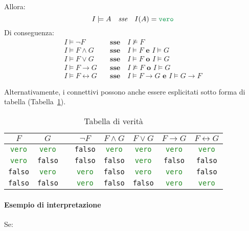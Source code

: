 \documentclass[italian, 10pt]{article}
\newcommand{\vero}{\textcolor{ForestGreen}{\texttt{vero}}\xspace} %
\newcommand{\falso}{\textcolor{BrickRed}{\texttt{falso}}\xspace} %
\begin{document}
Allora:
\[ I \models A  \quad \textit{sse} \quad I(A) = \vero \]
Di conseguenza:
\begin{align*}
  I \vDash \lnot F \quad             & \textbf{sse} \quad I \nvDash F                                                    \\
  I \vDash F \land G \quad           & \textbf{sse} \quad I \vDash F \textbf{ e } I \vDash G                             \\
  I \vDash F \lor G \quad            & \textbf{sse} \quad I \vDash F \textbf{ o } I \vDash G                             \\
  I \vDash F \rightarrow G \quad     & \textbf{sse} \quad I \nvDash F \textbf{ o } I \vDash G                            \\
  I \vDash F \leftrightarrow G \quad & \textbf{sse} \quad I \vDash F \rightarrow G \textbf{ e } I \vDash G \rightarrow F
\end{align*}

Alternativamente, i connettivi possono anche essere esplicitati sotto forma di tabella (Tabella~\ref{tab:tabella-connettivi}).

\begin{table}[htbp]
  \bigskip
  \centering
  \begin{tabular}{c|c|c|c|c|c|c|c}
    \(F\)  & \(G\)  &  & \(\lnot F\) & \(F \land G\) & \(F \lor G\) & \(F \rightarrow G\) & \(F \leftrightarrow G\) \\ \hline
    \vero  & \vero  &  & \falso      & \vero         & \vero        & \vero               & \vero                   \\
    \vero  & \falso &  & \falso      & \falso        & \vero        & \falso              & \falso                  \\
    \falso & \vero  &  & \vero       & \falso        & \vero        & \vero               & \falso                  \\
    \falso & \falso &  & \vero       & \falso        & \falso       & \vero               & \vero                   \\
  \end{tabular}
  \bigskip
  \caption{Tabella di verità}
  \label{tab:tabella-connettivi}
\end{table}

\paragraph{Esempio di interpretazione}

Se:
\end{document}
